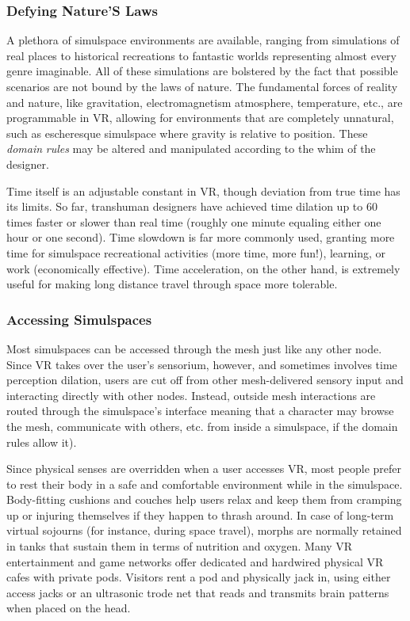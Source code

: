 \subsubsection{Defying Nature'S Laws}

A plethora of simulspace environments are available, 
ranging from simulations of real places to historical 
recreations to fantastic worlds representing almost 
every genre imaginable. All of these simulations are 
bolstered by the fact that possible scenarios are not 
bound by the laws of nature. The fundamental forces 
of reality and nature, like gravitation, electromagnetism
atmosphere, temperature, etc., are programmable
in VR, allowing for environments that are
completely unnatural, such as escheresque simulspace 
where gravity is relative to position. These \textit{domain }
\textit{rules} may be altered and manipulated according to 
the whim of the designer.

Time itself is an adjustable constant in VR, though 
deviation from true time has its limits. So far, transhuman
designers have achieved time dilation up to
60 times faster or slower than real time (roughly one 
minute equaling either one hour or one second). Time 
slowdown is far more commonly used, granting more 
time for simulspace recreational activities (more time, 
more fun!), learning, or work (economically effective). 
Time acceleration, on the other hand, is extremely 
useful for making long distance travel through space 
more tolerable.

\subsubsection{Accessing Simulspaces}

Most simulspaces can be accessed through the mesh 
just like any other node. Since VR takes over the 
user's sensorium, however, and sometimes involves 
time perception dilation, users are cut off from other 
mesh-delivered sensory input and interacting directly 
with other nodes. Instead, outside mesh interactions 
are routed through the simulspace's interface meaning
that a character may browse the mesh, communicate
with others, etc. from inside a simulspace, if the
domain rules allow it).

Since physical senses are overridden when a user 
accesses VR, most people prefer to rest their body 
in a safe and comfortable environment while in the 
simulspace. Body-fitting cushions and couches help 
users relax and keep them from cramping up or injuring
themselves if they happen to thrash around.
In case of long-term virtual sojourns (for instance, 
during space travel), morphs are normally retained 
in tanks that sustain them in terms of nutrition and 
oxygen. Many VR entertainment and game networks 
offer dedicated and hardwired physical VR cafes 
with private pods. Visitors rent a pod and physically 
jack in, using either access jacks or an ultrasonic 
trode net that reads and transmits brain patterns 
when placed on the head.

